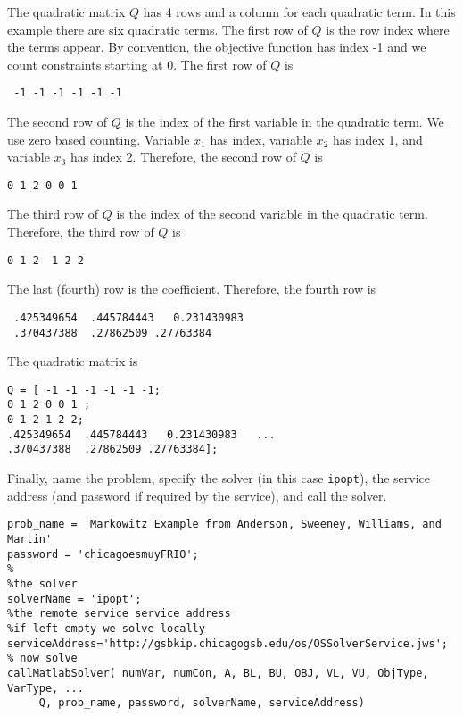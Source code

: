\documentclass[11pt]{article}
\renewcommand{\_}{{\char"5F}}
\renewcommand{\{}{{\char"7B}}
\renewcommand{\}}{{\char"7D}}
\renewcommand{\^}{{\char"0D}}
\renewcommand{\'}{{\char"0D}}
\begin{document}
 The quadratic matrix $Q$ has 4 rows and a column for each quadratic term. In this example there are six quadratic terms.  The first row of $Q$ is the row index where the terms appear. By convention, the objective function has index -1 and we count constraints starting at 0.  The first row of $Q$ is


 \begin{verbatim}
 -1 -1 -1 -1 -1 -1
 \end{verbatim}

The second row of $Q$ is the index of the first variable in the quadratic term. We use zero based counting.  Variable $x_{1}$ has index, variable  $x_{2}$ has index 1, and variable $x_{3}$ has index 2.  Therefore, the second row of $Q$ is



\begin{verbatim}
0 1 2 0 0 1
\end{verbatim}



The third row of $Q$ is the index of the second variable in the quadratic term.   Therefore, the third row of $Q$ is



\begin{verbatim}
0 1 2  1 2 2
\end{verbatim}



The last (fourth) row is the coefficient. Therefore, the fourth row is





\begin{verbatim}
 .425349654  .445784443   0.231430983
 .370437388  .27862509 .27763384
\end{verbatim}


The quadratic matrix is



\begin{verbatim}
Q = [ -1 -1 -1 -1 -1 -1;
0 1 2 0 0 1 ;
0 1 2 1 2 2;
.425349654  .445784443   0.231430983   ...
.370437388  .27862509 .27763384];
\end{verbatim}


Finally, name the problem, specify the solver (in this case {\tt ipopt}), the service address (and password if required by the service), and call the solver.



\begin{verbatim}
prob_name = 'Markowitz Example from Anderson, Sweeney, Williams, and Martin'
password = 'chicagoesmuyFRIO';
%
%the solver
solverName = 'ipopt';
%the remote service service address
%if left empty we solve locally
serviceAddress='http://gsbkip.chicagogsb.edu/os/OSSolverService.jws';
% now solve
callMatlabSolver( numVar, numCon, A, BL, BU, OBJ, VL, VU, ObjType, VarType, ...
     Q, prob_name, password, solverName, serviceAddress)
\end{verbatim}
\end{document}
